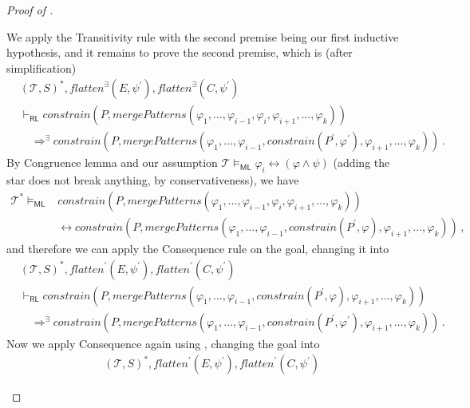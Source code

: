 \documentclass{article}
\newcommand{\RL}{\mathsf{RL}}
\newcommand{\ML}{\mathsf{ML}}
\begin{document}
\begin{proof}[Proof of ]
\begin{enumerate}
    We apply the Transitivity rule with the second premise being our first inductive hypothesis, and it remains to prove the second premise, which is (after simplification)
    \begin{align*}
        & (\mathcal{T}, S)^*, \mathit{flatten}^\exists(E, \psi^\prime), \mathit{flatten}^\exists(C, \psi^\prime)
        \\& \vdash_\RL
        \mathit{constrain}(P, \mathit{mergePatterns}(\varphi_1, \ldots, \varphi_{i-1}, \varphi_i, \varphi_{i+1}, \ldots,                          \varphi_k))
        \\&\quad \Rightarrow^\exists
        \mathit{constrain}(P, \mathit{mergePatterns}(\varphi_1, \ldots, \varphi_{i-1}, \mathit{constrain}(P^\prime, \varphi^\prime), \varphi_{i+1}, \ldots, \varphi_k) ) \, .
    \end{align*}
    By Congruence lemma and our assumption $\mathcal{T} \vDash_\ML \varphi_i \leftrightarrow (\varphi \land \psi)$ (adding the star does not break anything, by conservativeness), we have
    \begin{align*}
        \mathcal{T}^* \vDash_\ML &
        \mathit{constrain}(P, \mathit{mergePatterns}(\varphi_1, \ldots, \varphi_{i-1}, \varphi_i, \varphi_{i+1}, \ldots,                          \varphi_k))
        \\ & \leftrightarrow
        \mathit{constrain}(P, \mathit{mergePatterns}(\varphi_1, \ldots, \varphi_{i-1}, \mathit{constrain}(P^\prime, \varphi), \varphi_{i+1}, \ldots, \varphi_k)) \, ,
    \end{align*}
    and therefore we can apply the Consequence rule on the goal, changing it into
    \begin{align*}
        & (\mathcal{T}, S)^*, \mathit{flatten}^\prime(E, \psi^\prime), \mathit{flatten}^\prime(C, \psi^\prime)
        \\& \vdash_\RL
        \mathit{constrain}(P, \mathit{mergePatterns}(\varphi_1, \ldots, \varphi_{i-1}, \mathit{constrain}(P^\prime, \varphi), \varphi_{i+1}, \ldots,                          \varphi_k))
        \\&\quad \Rightarrow^\exists
        \mathit{constrain}(P, \mathit{mergePatterns}(\varphi_1, \ldots, \varphi_{i-1}, \mathit{constrain}(P^\prime, \varphi^\prime), \varphi_{i+1}, \ldots, \varphi_k)) \, .
    \end{align*}
    Now we apply Consequence again using ,
    changing the goal into
    \begin{align*}
        & (\mathcal{T}, S)^*, \mathit{flatten}^\prime(E, \psi^\prime), \mathit{flatten}^\prime(C, \psi^\prime)

\end{align*}
\end{enumerate}
\end{proof}
\end{document}
